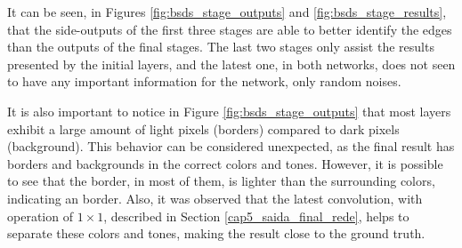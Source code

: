 
% 


It can be seen, in Figures \ref{fig:bsds_stage_outputs} and \ref{fig:bsds_stage_results}, that the side-outputs of the first three stages are able to better identify the edges than the outputs of the final stages.
The last two stages only assist the results presented by the initial layers, and the latest one, in both networks, does not seen to have any important information for the network, only random noises.

It is also important to notice in Figure \ref{fig:bsds_stage_outputs} that most layers exhibit a large amount of light pixels (borders) compared to dark pixels (background).
This behavior can be considered unexpected, as the final result has borders and backgrounds in the correct colors and tones.
However, it is possible to see that the border, in most of them, is lighter than the surrounding colors, indicating an border.
Also, it was observed that the latest convolution, with operation of $1 \times 1$, described in Section \ref{cap5_saida_final_rede}, helps to separate these colors and tones, making the result close to the ground truth.



